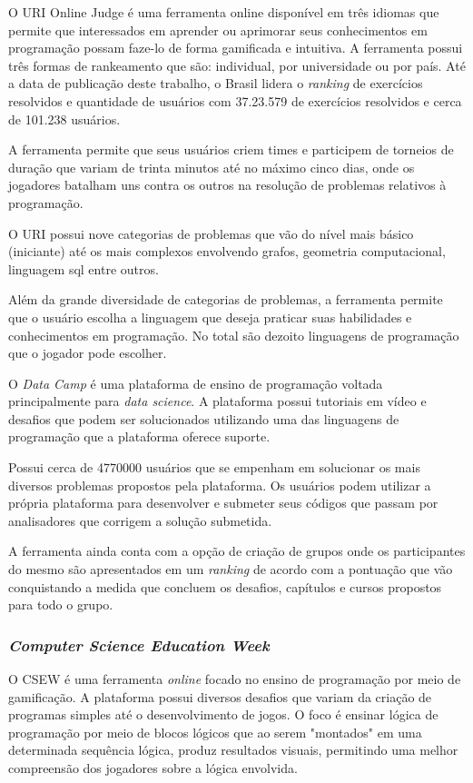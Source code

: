 O URI Online Judge é uma ferramenta online disponível em três idiomas que permite que interessados em aprender ou
aprimorar seus conhecimentos em programação possam faze-lo de forma gamificada e intuitiva. A ferramenta possui três
formas de rankeamento que são: individual, por universidade ou por país. Até a data de publicação deste trabalho, o Brasil
lidera o \textit{ranking} de exercícios resolvidos e quantidade de usuários com 37.23.579 de exercícios resolvidos e cerca
de 101.238 usuários. \cite{URI} 

A ferramenta permite que seus usuários criem times e participem de torneios de duração que variam de trinta minutos até no 
máximo cinco dias, onde os jogadores batalham uns contra os outros na resolução de problemas relativos à programação.

O URI possui nove categorias de problemas que vão do nível mais básico (iniciante) até os mais complexos envolvendo grafos,
geometria computacional, linguagem sql entre outros.

Além da grande diversidade de categorias de problemas, a ferramenta permite que o usuário escolha a linguagem que deseja
praticar suas habilidades e conhecimentos em programação. No total são dezoito linguagens de programação que o jogador pode 
escolher.

O \textit{Data Camp} é uma plataforma de ensino de programação voltada principalmente para \textit{data science}.
A plataforma possui tutoriais em vídeo e desafios que podem ser solucionados utilizando uma das linguagens de programação
que a plataforma oferece suporte. \cite{datacamp}

Possui cerca de 4770000 usuários que se empenham em solucionar os mais diversos problemas propostos pela plataforma. Os usuários
podem  utilizar a própria plataforma para desenvolver e submeter seus códigos que passam por analisadores que corrigem a solução submetida.

A ferramenta ainda conta com a opção de criação de grupos onde os participantes do mesmo são apresentados em um \textit{ranking} 
de acordo com a pontuação que vão conquistando a medida que concluem os desafios, capítulos e cursos propostos para todo o grupo.

\subsubsection{\textit{Computer Science Education Week}}
O CSEW é uma ferramenta \textit{online} focado no ensino de programação por meio de gamificação. A plataforma possui
diversos desafios que variam da criação de programas simples até o desenvolvimento de jogos. O foco é ensinar lógica de programação 
por meio de blocos lógicos que ao serem "montados" em uma determinada sequência lógica, produz resultados visuais, permitindo uma melhor
compreensão dos jogadores sobre a lógica envolvida.


